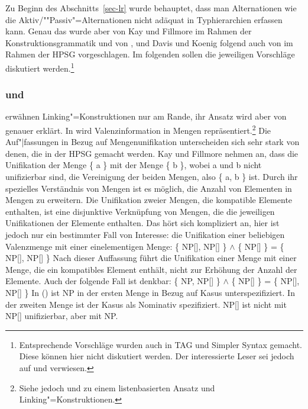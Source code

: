 Zu Beginn des Abschnitts~\ref{sec-lr} wurde behauptet, dass man Alternationen wie die
Aktiv/""Passiv"=Alternationen nicht adäquat in Typhierarchien erfassen kann. 
Genau das wurde aber von Kay und Fillmore im Rahmen der Konstruktionsgrammatik und 
von \citet{Koenig99a}, \citet{DK2000b-u} und Davis und Koenig folgend
auch von \citet{Kordoni2001b-u} im Rahmen der HPSG vorgeschlagen. Im
folgenden sollen die jeweiligen Vorschläge diskutiert werden.\footnote{
  Entsprechende Vorschläge wurden auch in TAG\indextag \parencites{Candito96a}[]{CK2003a-u} und Simpler Syntax \citep[Kapitel~6.3]{CJ2005a} gemacht. Diese können hier nicht diskutiert werden. Der interessierte Leser sei jedoch auf  und  verwiesen.
}

\subsubsection{\citet{KF99a} und \citet{MR2001a}}
\label{cxg-linking-konstruktionen}

\mbox{}\citet[]{KF99a}  erwähnen Linking"=Konstruktionen nur am Rande, ihr Ansatz wird aber
von \citet[Kapitel~4]{MR2001a} genauer erklärt. In  wird Valenzinformation
in Mengen repräsentiert.\footnote{
  Siehe jedoch  und  zu einem listenbasierten Ansatz und
  Linking"=Konstruktionen.
}
Die Auf"|fassungen in Bezug auf Mengenunifikation unterscheiden sich sehr
stark von denen, die in der HPSG gemacht werden. Kay und Fillmore nehmen an, dass
die Unifikation der Menge \{ a \} mit der Menge \{ b \}, wobei a und b nicht unifizierbar sind,
die Vereinigung der beiden Mengen, also \{ a, b \} ist.
Durch ihr spezielles Verständnis von Mengen ist es möglich, die Anzahl von Elementen in Mengen
zu erweitern. Die Unifikation zweier Mengen, die kompatible Elemente enthalten, ist eine disjunktive
Verknüpfung von Mengen, die die jeweiligen Unifikationen der Elemente enthalten. Das hört sich kompliziert
an, hier ist jedoch nur ein bestimmter Fall von Interesse: die Unifikation einer beliebigen
Valenzmenge mit einer einelementigen Menge:
\ea
\{ NP[\nom], NP[\acc] \} $\wedge$ \{ NP[\nom] \} = \{ NP[\nom], NP[\acc] \}
\z
Nach dieser Auffassung führt die Unifikation einer Menge mit einer Menge, die ein kompatibles
Element enthält, nicht zur Erhöhung der Anzahl der Elemente. Auch der folgende Fall ist denkbar:
\ea
\{ NP, NP[\acc] \} $\wedge$ \{ NP[\nom] \} = \{ NP[\nom], NP[\acc] \}
\z
In () ist NP in der ersten Menge in Bezug auf Kasus unterspezifiziert. In der zweiten Menge
ist der Kasus als Nominativ spezifiziert. NP[\nom] ist nicht mit  NP[\acc] unifizierbar, aber mit NP.

